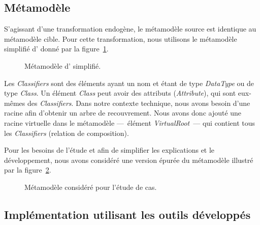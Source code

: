 \FloatBarrier


\subsection{Métamodèle}
\label{flattening:subsec:mm}

S'agissant d'une transformation endogène, le métamodèle source est identique au
métamodèle cible. Pour cette transformation, nous utilisons le métamodèle
simplifié d'{\uml} donné par la figure~\ref{fig:simplifiedumlmmodel}.

\begin{figure}[h]
  \begin{center}
    
    \caption{Métamodèle d'{\uml} simplifié.}
    \label{fig:simplifiedumlmmodel}
  \end{center}
\end{figure}

Les \emph{Classifiers} sont des éléments ayant un nom et étant de type
\emph{DataType} ou de type \emph{Class}. Un élément \emph{Class} peut avoir des
attributs (\emph{Attribute}), qui sont eux-mêmes des \emph{Classifiers}. Dans
notre contexte technique, nous avons besoin d'une racine afin d'obtenir un
arbre de recouvrement. Nous avons donc ajouté une racine virtuelle dans le
métamodèle ---~élément \emph{VirtualRoot}~--- qui contient tous les
\emph{Classifiers} (relation de composition). 

Pour les besoins de l'étude et afin de simplifier les explications et le
développement, nous avons considéré une version épurée du métamodèle
illustré par la figure~\ref{fig:verysimplifiedumlmmodel}.%


\begin{figure}[h]
  \begin{center}
    
    \caption{Métamodèle considéré pour l'étude de cas.}
    \label{fig:verysimplifiedumlmmodel}
  \end{center}
\end{figure}


\FloatBarrier

\subsection{Implémentation utilisant les outils développés}
\label{flattening:subsec:impl}

